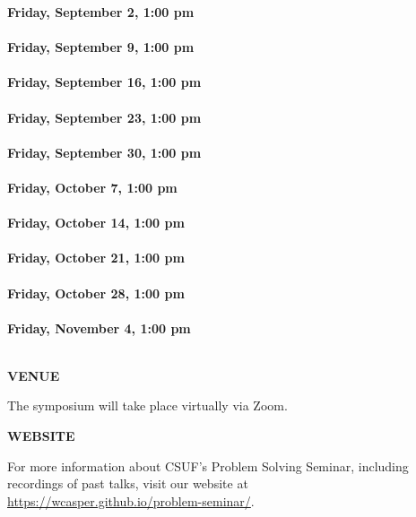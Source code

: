 \documentclass[a4paper]{article}
\begin{document}
\begin{minipage}{0.95\textwidth}
\begin{minipage}[b]{0.47\textwidth}
{\leavevmode \raggedright
\textbf{\color{cprimary}Friday, September 2, 1:00 pm}\\ \\
\textbf{\color{cprimary}Friday, September 9, 1:00 pm}\\ \\
\textbf{\color{cprimary}Friday, September 16, 1:00 pm}\\ \\
\textbf{\color{cprimary}Friday, September 23, 1:00 pm}\\ \\
\textbf{\color{cprimary}Friday, September 30, 1:00 pm}\\ \\
\textbf{\color{cprimary}Friday, October 7, 1:00 pm}\\ \\
\textbf{\color{cprimary}Friday, October 14, 1:00 pm}\\ \\
\textbf{\color{cprimary}Friday, October 21, 1:00 pm}\\ \\
\textbf{\color{cprimary}Friday, October 28, 1:00 pm}\\ \\
\textbf{\color{cprimary}Friday, November 4, 1:00 pm}\\ \\
\par{}
}

\vspace{0.2in}
\medskip

\large{\color{csecondary}\textbf{VENUE}}

The symposium will take place virtually via Zoom.

\medskip

\large{\color{csecondary}\textbf{WEBSITE}}

For more information about CSUF's Problem Solving Seminar, including recordings of past talks, visit our website at\\ \href{https://wcasper.github.io/problem-seminar/}{https://wcasper.github.io/problem-seminar/}.


\end{minipage}
\end{minipage}
\end{document}
